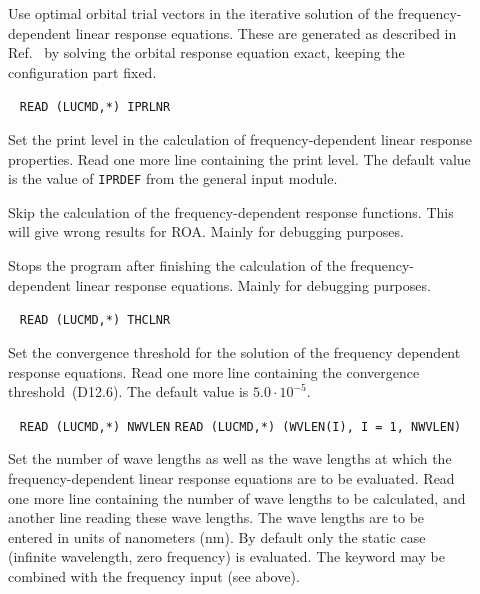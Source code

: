 \begin{description}
\item[] Use optimal orbital trial vectors in the 
iterative solution of the frequency-depen\-dent linear
response
equations. These are generated as described in
Ref.~\cite{tuhjahjajpjjcp84} by solving the orbital response equation
exact, keeping the configuration part fixed.

\item[]\verb| |\newline
\verb|READ (LUCMD,*) IPRLNR|

Set the print level in the calculation of frequency-dependent linear
response properties. Read one more line containing the print level.
The default value is the value of \verb|IPRDEF| from the general input
module. 

\item[] Skip the calculation of the frequency-dependent
response functions. This will give wrong results for ROA. Mainly for
debugging purposes.

\item[] Stops the program after finishing the
calculation of the frequency-dependent linear response equations. Mainly
for debugging purposes. 

\item[]\verb| |\newline
\verb|READ (LUCMD,*) THCLNR|

Set the convergence threshold for the solution
of the frequency dependent response equations. Read one more line
containing the convergence threshold~(D12.6). The default value is
$5.0\cdot10^{-5}$.

\item[]\verb| |\newline
\verb|READ (LUCMD,*) NWVLEN|\newline
\verb|READ (LUCMD,*) (WVLEN(I), I = 1, NWVLEN)|

Set the number of wave lengths as well as the wave
lengths at which the
frequency-dependent linear response equations are to be evaluated.
Read one more line containing the number of wave lengths to be
calculated, and another line reading these wave lengths. The
wave lengths are to be entered in units of nanometers (nm).
By default only the
static case (infinite wavelength, zero frequency) is evaluated.
The  keyword may be combined with the frequency input
 (see above).
\end{description}


